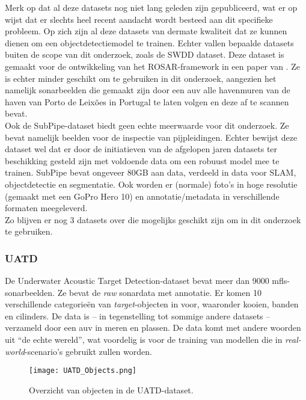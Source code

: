 Merk op dat al deze datasets nog niet lang geleden zijn gepubliceerd, wat er op wijst dat er slechts heel recent aandacht wordt besteed aan dit specifieke probleem. Op zich zijn al deze datasets van dermate kwaliteit dat ze kunnen dienen om een objectdetectiemodel te trainen. Echter vallen bepaalde datasets buiten de scope van dit onderzoek, zoals de SWDD dataset. Deze dataset is gemaakt voor de ontwikkeling van het ROSAR-framework in een paper van \textcite{Aubard_2024_ROSAR}. Ze is echter minder geschikt om te gebruiken in dit onderzoek, aangezien het namelijk sonarbeelden die gemaakt zijn door een \gls{auv} alle havenmuren van de haven van Porto de Leixões in Portugal te laten volgen en deze af te scannen bevat. \autocite{Aubard_2024_SWDD} \\

Ook de SubPipe-dataset biedt geen echte meerwaarde voor dit onderzoek. Ze bevat namelijk beelden voor de inspectie van pijpleidingen. Echter bewijst deze dataset wel dat er door de initiatieven van de afgelopen jaren datasets ter beschikking gesteld zijn met voldoende data om een robuust model mee te trainen. SubPipe bevat ongeveer 80GB aan data, verdeeld in data voor SLAM, objectdetectie en segmentatie. Ook worden er (normale) foto's in hoge resolutie (gemaakt met een GoPro Hero 10) en annotatie/metadata in verschillende formaten meegeleverd. \autocite{Alvarez_Tunon_2024} \\

Zo blijven er nog 3 datasets over die mogelijks geschikt zijn om in dit onderzoek te gebruiken. 

\newpage

\subsubsection{UATD}

De Underwater Acoustic Target Detection-dataset bevat meer dan 9000 \gls{mfls}-sonarbeelden. Ze bevat de \emph{raw} sonardata met annotatie. Er komen 10 verschillende categorieën van \emph{target}-objecten in voor, waaronder kooien, banden en cilinders. De data is -- in tegenstelling tot sommige andere datasets -- verzameld door een \gls{auv} in meren en plassen. De data komt met andere woorden uit ``de echte wereld'', wat voordelig is voor de training van modellen die in \emph{real-world}-scenario's gebruikt zullen worden. \autocite{Xie_2022}

\begin{figure}[H]
    \centering
    \texttt{[image: UATD\_Objects.png]}
    \caption[UATD Objecten.]{\label{fig:uatd_objects}Overzicht van objecten in de UATD-dataset. \autocite{Xie_2022}}
\end{figure}

